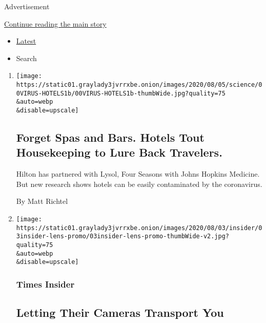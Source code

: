 Advertisement

\protect\hyperlink{after-mid2}{Continue reading the main story}

\begin{itemize}
\tightlist
\item
  \protect\hyperlink{stream-panel}{Latest}
\item
  Search
\end{itemize}

\begin{enumerate}
\def\labelenumi{\arabic{enumi}.}
\item
  \href{/2020/08/04/health/coronavirus-hotels-infect.html}{}

  \texttt{[image: https://static01.graylady3jvrrxbe.onion/images/2020/08/05/science/00VIRUS-HOTELS1b/00VIRUS-HOTELS1b-thumbWide.jpg?quality=75\\\&auto=webp\\\&disable=upscale]}

  \hypertarget{forget-spas-and-bars-hotels-tout-housekeeping-to-lure-back-travelers}{%
  \subsection{Forget Spas and Bars. Hotels Tout Housekeeping to Lure
  Back
  Travelers.}\label{forget-spas-and-bars-hotels-tout-housekeeping-to-lure-back-travelers}}

  Hilton has partnered with Lysol, Four Seasons with Johns Hopkins
  Medicine. But new research shows hotels can be easily contaminated by
  the coronavirus.

  By Matt Richtel
\item
  \href{/2020/08/03/insider/letting-their-cameras-transport-you.html}{}

  \texttt{[image: https://static01.graylady3jvrrxbe.onion/images/2020/08/03/insider/03insider-lens-promo/03insider-lens-promo-thumbWide-v2.jpg?quality=75\\\&auto=webp\\\&disable=upscale]}

  \hypertarget{times-insider}{%
  \subsubsection{Times Insider}\label{times-insider}}

  \hypertarget{letting-their-cameras-transport-you}{%
  \subsection{Letting Their Cameras Transport
  You}\label{letting-their-cameras-transport-you}}


\end{enumerate}
